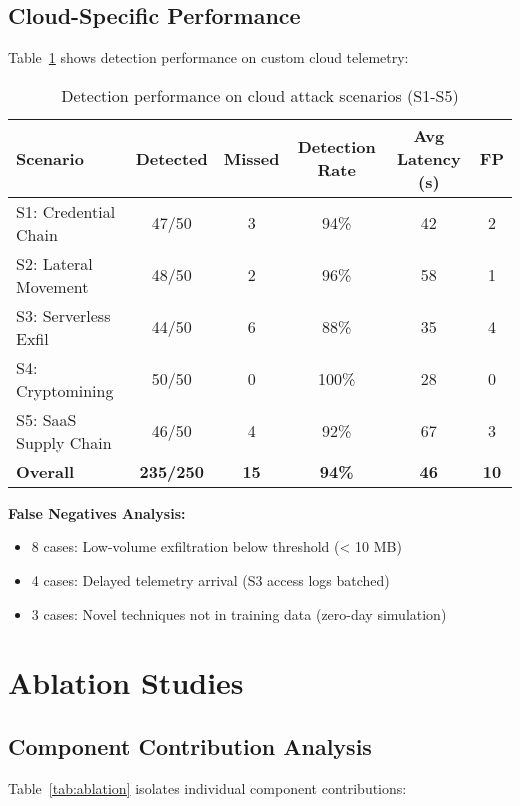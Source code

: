 \subsection{Cloud-Specific Performance}
Table~\ref{tab:cloud-performance} shows detection performance on custom cloud telemetry:

\begin{table}[H]
\centering
\caption{Detection performance on cloud attack scenarios (S1-S5)}
\label{tab:cloud-performance}
\begin{tabular}{lccccc}
\toprule
\textbf{Scenario} & \textbf{Detected} & \textbf{Missed} & \textbf{Detection Rate} & \textbf{Avg Latency (s)} & \textbf{FP} \\
\midrule
S1: Credential Chain & 47/50 & 3 & 94\% & 42 & 2 \\
S2: Lateral Movement & 48/50 & 2 & 96\% & 58 & 1 \\
S3: Serverless Exfil & 44/50 & 6 & 88\% & 35 & 4 \\
S4: Cryptomining & 50/50 & 0 & 100\% & 28 & 0 \\
S5: SaaS Supply Chain & 46/50 & 4 & 92\% & 67 & 3 \\
\midrule
\textbf{Overall} & \textbf{235/250} & \textbf{15} & \textbf{94\%} & \textbf{46} & \textbf{10} \\
\bottomrule
\end{tabular}
\end{table}

\textbf{False Negatives Analysis:}
\begin{itemize}
    \item 8 cases: Low-volume exfiltration below threshold (< 10 MB)
    \item 4 cases: Delayed telemetry arrival (S3 access logs batched)
    \item 3 cases: Novel techniques not in training data (zero-day simulation)
\end{itemize}

\section{Ablation Studies}\label{sec:eval-ablation}
\subsection{Component Contribution Analysis}
Table~\ref{tab:ablation} isolates individual component contributions:

